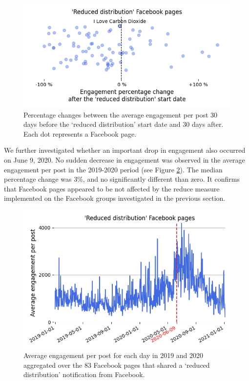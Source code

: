 \documentclass[11pt,a4paper]{article}
\begin{document}
\begin{figure}[!h]
\centering
\includegraphics[width=\linewidth]{./../figure/reduce_percentage_change.png}
\caption{Percentage changes between the average engagement per post 30 days before the `reduced distribution' start date and 30 days after. Each dot represents a Facebook page.}
\label{reduce_percentage_change}
\end{figure}
 
We further investigated whether an important drop in engagement also occurred on June 9, 2020. 
No sudden decrease in engagement was observed in the average engagement per post in the 2019-2020 period (see Figure \ref{reduce_average_timeseries}).
The median percentage change was 3\%, and no significantly different than zero.
It confirms that Facebook pages appeared to be not affected by the reduce measure implemented on the Facebook groups investigated in the previous section.

\begin{figure}[!h]
\centering
\includegraphics[width=\linewidth]{./../figure/reduce_average_timeseries.png}
\caption{Average engagement per post for each day in 2019 and 2020 aggregated over the 83 Facebook pages that shared a `reduced distribution' notification from Facebook.}
\label{reduce_average_timeseries}
\end{figure}
\end{document}
